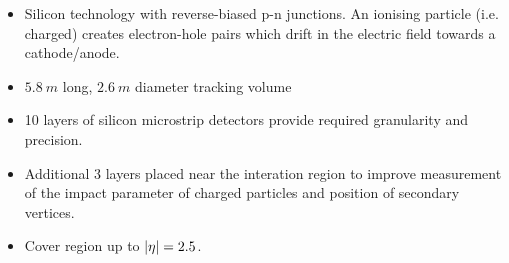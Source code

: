 \begin{itemize}
    \item Silicon technology with reverse-biased p-n junctions. An ionising
        particle (i.e. charged) creates electron-hole pairs which drift in the
        electric field towards a cathode/anode.
    \item ${\SI{5.8}{m}}$ long, ${\SI{2.6}{m}}$ diameter tracking volume
    \item 10 layers of silicon microstrip detectors provide required granularity
        and precision.
    \item Additional 3 layers placed near the interation region to improve
        measurement of the impact parameter of charged particles and position
        of secondary vertices.
    \item Cover region up to ${|\eta|=2.5}$.
\end{itemize}

\subsection{\ECAL}


